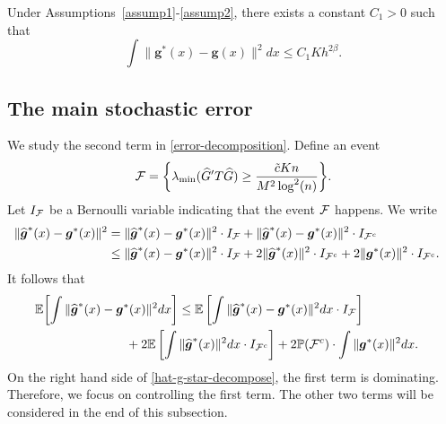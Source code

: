 \documentclass[preprint,11pt]{article}
\numberwithin{equation}{section}
\newcommand{\beq}{\begin{equation}}
\newcommand{\eeq}{\end{equation}}
\begin{document}
\begin{lemma} \label{lem:error1}
Under Assumptions~\ref{assump1}-\ref{assump2}, there exists a constant $C_1>0$ such that
\[
\int \|{\boldsymbol g}^*(x)-{\boldsymbol g}(x)\|^2dx\leq C_1 Kh^{2\beta}.
\]


\end{lemma}

\subsection{The main stochastic error} \label{subsec:stochastic-error-1}
We study the second term in \eqref{error-decomposition}. Define an event 
\beq \label{small-prob-event}
{\cal F} = \biggl\{ \lambda_{\min}(\widehat{G}'T\widehat{G}) \geq   \frac{\tilde{c} Kn}{M^2\log^2(n)} \biggr\}.
\eeq
Let $I_{\cal F}$ be a Bernoulli variable indicating that the event ${\cal F}$ happens.  
We write 
\begin{align*}
\|\widehat{\boldsymbol g}^*(x)-{\boldsymbol g}^*(x)\|^2 &= \|\widehat{\boldsymbol g}^*(x)-{\boldsymbol g}^*(x)\|^2 \cdot I_{\cal F} +  \|\widehat{\boldsymbol g}^*(x)-{\boldsymbol g}^*(x)\|^2\cdot I_{{\cal F}^c} \cr
&\leq \|\widehat{\boldsymbol g}^*(x)-{\boldsymbol g}^*(x)\|^2 \cdot I_{\cal F} + 2\|\widehat{\boldsymbol g}^*(x)\|^2 \cdot I_{{\cal F}^c} + 2\|{\boldsymbol g}^*(x)\|^2 \cdot I_{{\cal F}^c}.  
\end{align*}
It follows that
\begin{align} \label{hat-g-star-decompose}
\mathbb{E}\biggl[ \int\|\widehat{\boldsymbol g}^*(x) & -{\boldsymbol g}^*(x)\|^2dx  \biggr]  \leq 
\mathbb{E}\left[ \int\|\widehat{\boldsymbol g}^*(x)-{\boldsymbol g}^*(x)\|^2 dx \cdot I_{\cal F}\right] \cr
&\qquad +2 \mathbb{E}\left[ \int \|\widehat{\boldsymbol g}^*(x)\|^2dx \cdot I_{{\cal F}^c} \right] + 2\mathbb{P}({\cal F}^c)\cdot \int \|{\boldsymbol g}^*(x)\|^2dx. 
\end{align}
On the right hand side of \eqref{hat-g-star-decompose}, the first term is dominating. Therefore, we focus on controlling the first term. The other two terms will be considered in the end of this subsection. 

\end{document}

